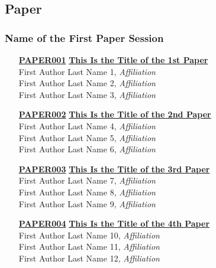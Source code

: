
\subsection{Paper}
\subsubsection{Name of the First Paper Session}
\begin{enumerate}
\item[\href{https://doi.org/10.1145/1122445.1122456}{\textbf{PAPER001}}]
\href{https://doi.org/10.1145/1122445.1122456}{\textbf{This Is the Title of the 1st Paper}}\\
First Author Last Name 1, \emph{Affiliation}\\
First Author Last Name 2, \emph{Affiliation}\\
First Author Last Name 3, \emph{Affiliation}\\

\item[\href{https://doi.org/10.1145/1122445.1122456}{\textbf{PAPER002}}]
\href{https://doi.org/10.1145/1122445.1122456}{\textbf{This Is the Title of the 2nd Paper}}\\
First Author Last Name 4, \emph{Affiliation}\\
First Author Last Name 5, \emph{Affiliation}\\
First Author Last Name 6, \emph{Affiliation}\\

\item[\href{https://doi.org/10.1145/1122445.1122456}{\textbf{PAPER003}}]
\href{https://doi.org/10.1145/1122445.1122456}{\textbf{This Is the Title of the 3rd Paper}}\\
First Author Last Name 7, \emph{Affiliation}\\
First Author Last Name 8, \emph{Affiliation}\\
First Author Last Name 9, \emph{Affiliation}\\

\item[\href{https://doi.org/10.1145/1122445.1122456}{\textbf{PAPER004}}]
\href{https://doi.org/10.1145/1122445.1122456}{\textbf{This Is the Title of the 4th Paper}}\\
First Author Last Name 10, \emph{Affiliation}\\
First Author Last Name 11, \emph{Affiliation}\\
First Author Last Name 12, \emph{Affiliation}\\
\end{enumerate}

